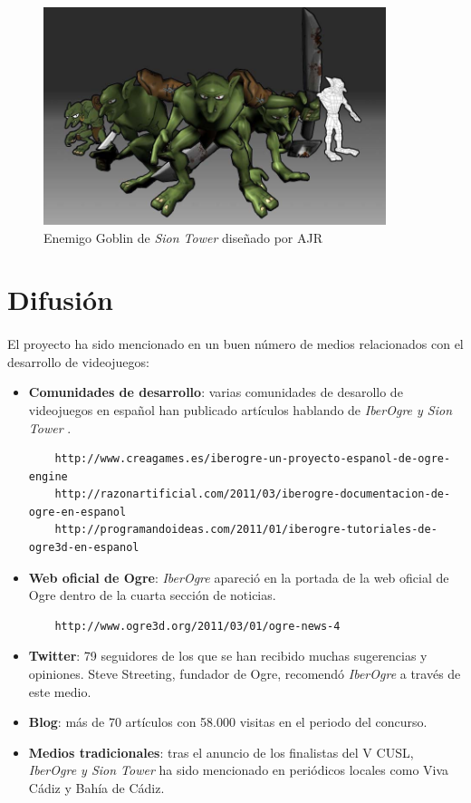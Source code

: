 \documentclass[16pt,spanish]{article}
\def \proyecto{\emph {IberOgre y Sion Tower} }
\def \juego{\emph {Sion Tower} }
\def \wiki{\emph{IberOgre} }
\begin{document}
\begin{figure}[H]
    \centering
        \includegraphics[width=10cm]{img/collage-goblin.jpg} 
    \caption{Enemigo Goblin de \juego diseñado por AJR}
    \label{img:collage-goblin}
\end{figure}


\section{Difusión}

\paragraph{}
El proyecto ha sido mencionado en un buen número de medios relacionados
con el desarrollo de videojuegos:

\begin{itemize}
    \item \textbf{Comunidades de desarrollo}: varias comunidades de desarollo
    de videojuegos en español han publicado artículos hablando de \proyecto.
    \begin{verbatim}
    http://www.creagames.es/iberogre-un-proyecto-espanol-de-ogre-engine
    http://razonartificial.com/2011/03/iberogre-documentacion-de-ogre-en-espanol
    http://programandoideas.com/2011/01/iberogre-tutoriales-de-ogre3d-en-espanol
    \end{verbatim}
    \item \textbf{Web oficial de Ogre}: \wiki apareció en la portada de
    la web oficial de Ogre dentro de la cuarta sección de noticias.
    \begin{verbatim}
    http://www.ogre3d.org/2011/03/01/ogre-news-4
    \end{verbatim}
    \item \textbf{Twitter}: 79 seguidores de los que se han recibido muchas
    sugerencias y opiniones. Steve Streeting, fundador de Ogre, recomendó
    \wiki a través de este medio.
    \item \textbf{Blog}: más de 70 artículos con 58.000 visitas en el
    periodo del concurso.
    \item \textbf{Medios tradicionales}: tras el anuncio de los finalistas
    del V CUSL, \proyecto ha sido mencionado en periódicos locales como Viva Cádiz
    y Bahía de Cádiz.
\end{itemize}
\end{document}
